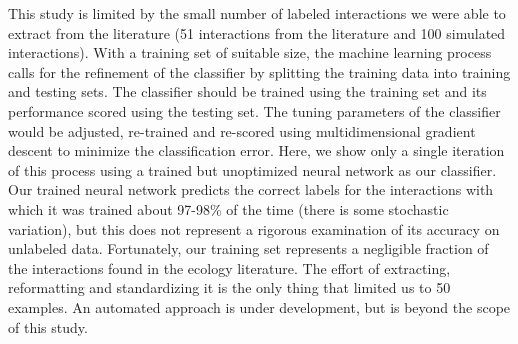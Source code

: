 This study is limited by the small number of labeled interactions we were able to extract from the literature (51 interactions from the literature and 100 simulated interactions). With a training set of suitable size, the machine learning process calls for the refinement of the classifier by splitting the training data into training and testing sets. The classifier should be trained using the training set and its performance scored using the testing set. The tuning parameters of the classifier would be adjusted, re-trained and re-scored using multidimensional gradient descent to minimize the classification error. Here, we show only a single iteration of this process using a trained but unoptimized neural network as our classifier. Our trained neural network predicts the correct labels for the interactions with which it was trained about 97-98\% of the time (there is some stochastic variation), but this does not represent a rigorous examination of its accuracy on unlabeled data. Fortunately, our training set represents a negligible fraction of the interactions found in the ecology literature. The effort of extracting, reformatting and standardizing it is the only thing that limited us to 50 examples. An automated approach is under development, but is beyond the scope of this study.